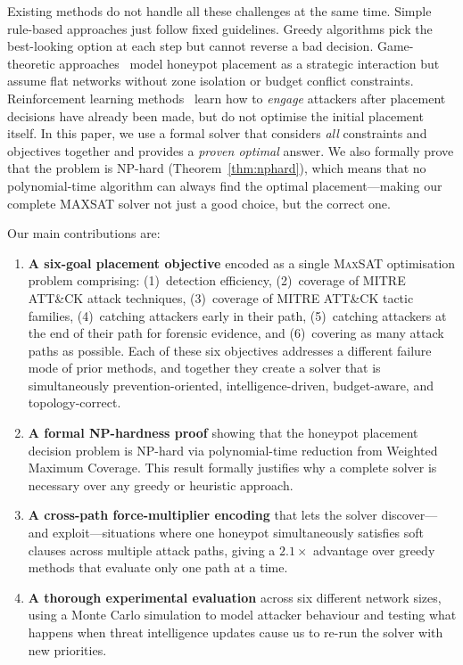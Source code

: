 \documentclass[journal]{IEEEtran}
\newcommand{\maxsat}{\textsc{MaxSAT}}
\begin{document}
Existing methods do not handle all these challenges at the
same time.
Simple rule-based approaches just follow fixed guidelines.
Greedy algorithms pick the best-looking option at each step
but cannot reverse a bad decision.
Game-theoretic approaches~\cite{kiekintveld2015,pawlick2019}
model honeypot placement as a strategic interaction but
assume flat networks without zone isolation or budget
conflict constraints.
Reinforcement learning methods~\cite{huang2019} learn how to
\emph{engage} attackers after placement decisions have
already been made, but do not optimise the initial placement
itself.
In this paper, we use a formal solver that considers
\emph{all} constraints and objectives together and provides
a \emph{proven optimal} answer.
We also formally prove that the problem is NP-hard
(Theorem~\ref{thm:nphard}), which means that no
polynomial-time algorithm can always find the optimal
placement---making our complete MAXSAT solver not just a
good choice, but the correct one.

Our main contributions are:
\begin{enumerate}
\item \textbf{A six-goal placement objective} encoded as a
single \maxsat{} optimisation problem comprising:
(1)~detection efficiency,
(2)~coverage of MITRE ATT\&CK attack techniques,
(3)~coverage of MITRE ATT\&CK tactic families,
(4)~catching attackers early in their path,
(5)~catching attackers at the end of their path for forensic
evidence, and
(6)~covering as many attack paths as possible.
Each of these six objectives addresses a different failure
mode of prior methods, and together they create a
solver that is simultaneously prevention-oriented,
intelligence-driven, budget-aware, and topology-correct.

\item \textbf{A formal NP-hardness proof} showing that the
honeypot placement decision problem is NP-hard via
polynomial-time reduction from Weighted Maximum Coverage.
This result formally justifies why a complete solver is
necessary over any greedy or heuristic approach.

\item \textbf{A cross-path force-multiplier encoding} that
lets the solver discover---and exploit---situations where one
honeypot simultaneously satisfies soft clauses across
multiple attack paths, giving a $2.1\times$ advantage over
greedy methods that evaluate only one path at a time.

\item \textbf{A thorough experimental evaluation} across six
different network sizes, using a Monte Carlo simulation to
model attacker behaviour and testing what happens when threat
intelligence updates cause us to re-run the solver with new
priorities.
\end{enumerate}
\end{document}
